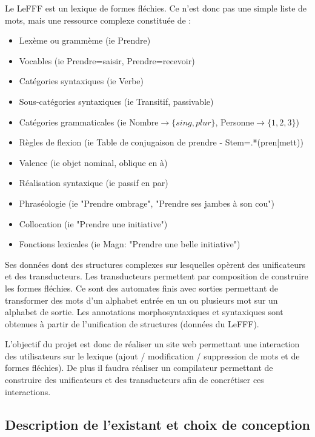 \documentclass[12pt,a4paper]{article}
\begin{document}
Le LeFFF est un lexique de formes fléchies. Ce n'est donc pas une simple liste de mots, mais une ressource complexe constituée de :
\begin{itemize}  
  \item Lexème ou grammème (ie Prendre)
  \item Vocables (ie Prendre=saisir, Prendre=recevoir)
  \item Catégories syntaxiques (ie Verbe)
  \item Sous-catégories syntaxiques (ie Transitif, passivable)
  \item Catégories grammaticales (ie Nombre$\rightarrow\{sing, plur\}$, Personne$\rightarrow\{1, 2, 3\}$)
  \item Règles de flexion (ie Table de conjugaison de prendre - Stem=.*(pren|mett))
  \item Valence (ie objet nominal, oblique en à)
  \item Réalisation syntaxique (ie passif en par)
  \item Phraséologie (ie "Prendre ombrage", "Prendre ses jambes à son cou")
  \item Collocation (ie "Prendre une initiative")
  \item Fonctions lexicales (ie Magn: "Prendre une belle initiative")
\end{itemize}

\smallbreak

Ses données dont des structures complexes sur lesquelles opèrent des unificateurs et des transducteurs.
\newline Les transducteurs permettent par composition de construire les formes fléchies. 
Ce sont des automates finis avec sorties permettant de transformer des mots d'un alphabet entrée en un ou plusieurs mot sur un alphabet de sortie.
\newline Les annotations morphosyntaxiques et syntaxiques sont obtenues à partir de l'unification de structures (données du LeFFF).

\smallbreak

L'objectif du projet est donc de réaliser un site web permettant une interaction des utilisateurs sur le lexique (ajout / modification / suppression de mots et de formes fléchies). 
De plus il faudra réaliser un compilateur permettant de construire des unificateurs et des transducteurs afin de concrétiser ces interactions.

\subsection{Description de l'existant et choix de conception}
\end{document}

